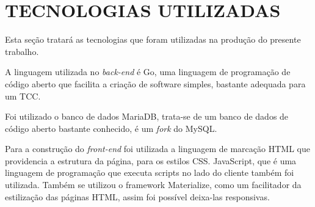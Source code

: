 %
%

\section{TECNOLOGIAS UTILIZADAS}

Esta seção tratará as tecnologias que foram utilizadas na produção do presente trabalho.

A linguagem utilizada no \textit{back-end} é Go, uma linguagem de programação de código aberto que facilita a criação de software simples, bastante adequada para um TCC.

Foi utilizado o banco de dados MariaDB, trata-se de um banco de dados de código aberto bastante conhecido, é um \textit{fork} do MySQL.

Para a construção do \textit{front-end} foi utilizada a linguagem de marcação HTML que providencia a estrutura da página, para os estilos CSS. JavaScript, que é uma linguagem de programação que executa scripts no lado do cliente também foi utilizada. Também se utilizou o framework Materialize, como um facilitador da estilização das páginas HTML, assim foi possível deixa-las responsivas.
